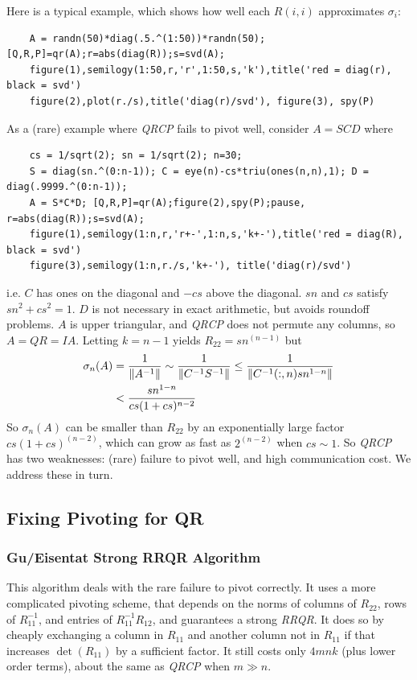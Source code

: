 \documentclass[11pt]{article}
\numberwithin{equation}{section}
\begin{document}
Here is a typical example, which shows how well each $R(i,i)$ approximates $\sigma_i$:
\begin{verbatim}
    A = randn(50)*diag(.5.^(1:50))*randn(50);[Q,R,P]=qr(A);r=abs(diag(R));s=svd(A);
    figure(1),semilogy(1:50,r,'r',1:50,s,'k'),title('red = diag(r), black = svd')
    figure(2),plot(r./s),title('diag(r)/svd'), figure(3), spy(P)
\end{verbatim}


As a (rare) example where \textit{QRCP} fails to pivot well, consider $A = SCD$ where
\begin{verbatim}
    cs = 1/sqrt(2); sn = 1/sqrt(2); n=30;
    S = diag(sn.^(0:n-1)); C = eye(n)-cs*triu(ones(n,n),1); D = diag(.9999.^(0:n-1));
    A = S*C*D; [Q,R,P]=qr(A);figure(2),spy(P);pause, r=abs(diag(R));s=svd(A);
    figure(1),semilogy(1:n,r,'r+-',1:n,s,'k+-'),title('red = diag(R), black = svd')
    figure(3),semilogy(1:n,r./s,'k+-'), title('diag(r)/svd')
\end{verbatim}

i.e. $C$ has ones on the diagonal and $-cs$ above the diagonal. $sn$ and $cs$ satisfy $sn^2+cs^2=1$. $D$ is not necessary in exact arithmetic, 
but avoids roundoff problems. $A$ is upper triangular, and \textit{QRCP} does not permute any columns, so $A = QR = IA$.
Letting $k=n-1$ yields $R_{22} = sn^(n-1)$ but \begin{align*}
    \sigma_n (A) &= \frac{1}{\left\| A^{-1} \right\|} \sim \frac{1}{\left\| C^{-1}S^{-1} \right\|} \leq \frac{1}{\left\| C^{-1}(:,n)sn^{1-n} \right\|} \\
    &< \frac{sn^{1-n}}{cs(1+cs)^{n-2}}
\end{align*}
So $\sigma_n(A)$ can be smaller than $R_{22}$ by an exponentially large factor $cs(1+cs)^(n-2)$, which can grow as fast as $2^(n-2)$ when $cs \sim 1$.
So \textit{QRCP} has two weaknesses: (rare) failure to pivot well, and high communication cost. We address these in turn.

\subsection{Fixing Pivoting for QR}
\subsubsection{Gu/Eisentat Strong RRQR Algorithm}
This algorithm deals with the rare failure to pivot correctly. It uses a more complicated pivoting scheme, that depends on the norms of columns of $R_{22}$, 
rows of $R_{11}^{-1}$, and entries of $R_{11}^{-1}R_{12}$, and guarantees a strong \textit{RRQR}. It does so by cheaply exchanging a column in $R_{11}$ 
and another column not in $R_{11}$ if that increases $\operatorname{det}(R_{11})$ by a sufficient factor.
It still costs only $4mnk$ (plus lower order terms), about the same as \textit{QRCP} when $m \gg n$.
\end{document}
